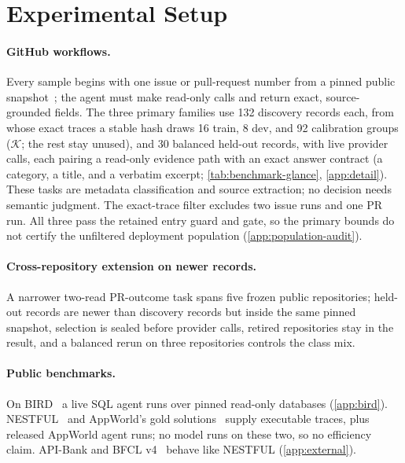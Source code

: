 \section{Experimental Setup}
\label{sec:setup}

\paragraph{GitHub workflows.}
Every sample begins with one issue or pull-request number from a pinned public
snapshot~\citep{githubissuesdataset}; the agent must make read-only calls and return exact,
source-grounded fields. The three primary families use
132 discovery records each, from whose exact traces a stable hash draws 16
train, 8 dev, and 92 calibration groups ($\mathcal{K}$; the rest stay unused), and 30
balanced held-out records, with live provider calls, each pairing a read-only
evidence path with an exact answer contract (a category, a title, and a
verbatim excerpt; \cref{tab:benchmark-glance}, \cref{app:detail}). These tasks are metadata
classification and source extraction; no decision needs semantic judgment. The
exact-trace filter excludes two issue runs and one PR run. All three pass the
retained entry guard and gate, so the primary bounds do not certify the
unfiltered deployment population (\cref{app:population-audit}).

\paragraph{Cross-repository extension on newer records.}
A narrower two-read PR-outcome task spans five frozen public repositories;
held-out records are newer than discovery records but inside the same pinned
snapshot, selection is sealed before provider calls, retired repositories stay
in the result, and a balanced rerun on three repositories controls the class mix.

\paragraph{Public benchmarks.}
On BIRD~\citep{li2023bird} a live SQL agent runs over pinned read-only
databases (\cref{app:bird}). NESTFUL~\citep{basu2025nestful} and AppWorld's gold
solutions~\citep{trivedi2024appworld} supply executable traces, plus released
AppWorld agent runs; no model runs on these two, so no efficiency claim. API-Bank and BFCL v4~\citep{li2023apibank,patil2025bfcl}
behave like NESTFUL (\cref{app:external}).


